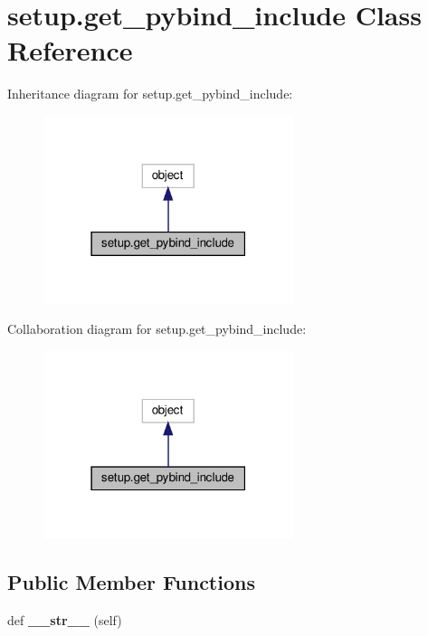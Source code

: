 \hypertarget{classsetup_1_1get__pybind__include}{}\section{setup.\+get\+\_\+pybind\+\_\+include Class Reference}
\label{classsetup_1_1get__pybind__include}


Inheritance diagram for setup.\+get\+\_\+pybind\+\_\+include\+:\nopagebreak
\begin{figure}[H]
\begin{center}
\leavevmode
\includegraphics[width=207pt]{classsetup_1_1get__pybind__include__inherit__graph}
\end{center}
\end{figure}


Collaboration diagram for setup.\+get\+\_\+pybind\+\_\+include\+:\nopagebreak
\begin{figure}[H]
\begin{center}
\leavevmode
\includegraphics[width=207pt]{classsetup_1_1get__pybind__include__coll__graph}
\end{center}
\end{figure}
\subsection*{Public Member Functions}
\begin{DoxyCompactItemize}
\item 
\mbox{\label{classsetup_1_1get__pybind__include_a18325cf8f6566c923226d9a145ba666d}} 
def {\bfseries \+\_\+\+\_\+str\+\_\+\+\_\+} (self)
\end{DoxyCompactItemize}


